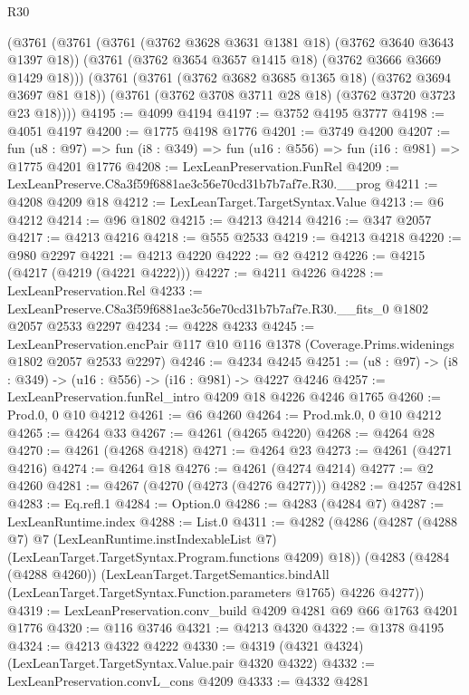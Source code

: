 \begin{lexlean}{R30}
\begin{coremodule}
    (@3761
      (@3761
        (@3761 (@3762 @3628 @3631 @1381 @18) (@3762 @3640 @3643 @1397 @18))
        (@3761 (@3762 @3654 @3657 @1415 @18) (@3762 @3666 @3669 @1429 @18)))
      (@3761
        (@3761 (@3762 @3682 @3685 @1365 @18) (@3762 @3694 @3697 @81 @18))
        (@3761 (@3762 @3708 @3711 @28 @18) (@3762 @3720 @3723 @23 @18))))
@4195 := @4099 @4194
@4197 := @3752 @4195 @3777
@4198 := @4051 @4197
@4200 := @1775 @4198 @1776
@4201 := @3749 @4200
@4207 := fun (u8 : @97) =>
  fun (i8 : @349) => fun (u16 : @556) => fun (i16 : @981) => @1775 @4201 @1776
@4208 := LexLeanPreservation.FunRel
@4209 := LexLeanPreserve.C8a3f59f6881ae3c56e70cd31b7b7af7e.R30.__prog
@4211 := @4208 @4209 @18
@4212 := LexLeanTarget.TargetSyntax.Value
@4213 := @6 @4212
@4214 := @96 @1802
@4215 := @4213 @4214
@4216 := @347 @2057
@4217 := @4213 @4216
@4218 := @555 @2533
@4219 := @4213 @4218
@4220 := @980 @2297
@4221 := @4213 @4220
@4222 := @2 @4212
@4226 := @4215 (@4217 (@4219 (@4221 @4222)))
@4227 := @4211 @4226
@4228 := LexLeanPreservation.Rel
@4233 := LexLeanPreserve.C8a3f59f6881ae3c56e70cd31b7b7af7e.R30.__fits_0 @1802 @2057 @2533 @2297
@4234 := @4228 @4233
@4245 := LexLeanPreservation.encPair
    @117
    @10
    @116
    @1378
    (Coverage.Prims.widenings @1802 @2057 @2533 @2297)
@4246 := @4234 @4245
@4251 := (u8 : @97) -> (i8 : @349) -> (u16 : @556) -> (i16 : @981) -> @4227 @4246
@4257 := LexLeanPreservation.funRel_intro @4209 @18 @4226 @4246 @1765
@4260 := Prod.{0, 0} @10 @4212
@4261 := @6 @4260
@4264 := Prod.mk.{0, 0} @10 @4212
@4265 := @4264 @33
@4267 := @4261 (@4265 @4220)
@4268 := @4264 @28
@4270 := @4261 (@4268 @4218)
@4271 := @4264 @23
@4273 := @4261 (@4271 @4216)
@4274 := @4264 @18
@4276 := @4261 (@4274 @4214)
@4277 := @2 @4260
@4281 := @4267 (@4270 (@4273 (@4276 @4277)))
@4282 := @4257 @4281
@4283 := Eq.refl.{1}
@4284 := Option.{0}
@4286 := @4283 (@4284 @7)
@4287 := LexLeanRuntime.index
@4288 := List.{0}
@4311 := @4282
    (@4286
      (@4287
        (@4288 @7)
        @7
        (LexLeanRuntime.instIndexableList @7)
        (LexLeanTarget.TargetSyntax.Program.functions @4209)
        @18))
    (@4283
      (@4284 (@4288 @4260))
      (LexLeanTarget.TargetSemantics.bindAll
        (LexLeanTarget.TargetSyntax.Function.parameters @1765)
        @4226
        @4277))
@4319 := LexLeanPreservation.conv_build @4209 @4281 @69 @66 @1763 @4201 @1776
@4320 := @116 @3746
@4321 := @4213 @4320
@4322 := @1378 @4195
@4324 := @4213 @4322 @4222
@4330 := @4319 (@4321 @4324) (LexLeanTarget.TargetSyntax.Value.pair @4320 @4322)
@4332 := LexLeanPreservation.convL_cons @4209
@4333 := @4332 @4281

\end{coremodule}
\end{lexlean}
